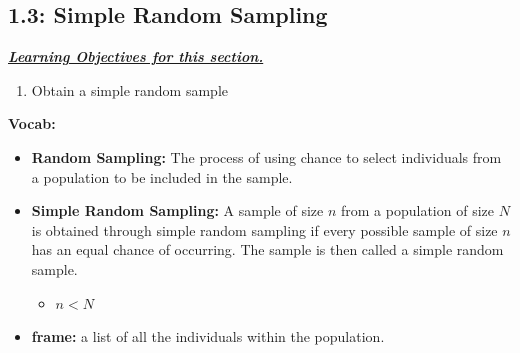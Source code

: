 \documentclass{report}
\begin{document}
        \pagebreak \bigbreak \noindent
        \subsection{1.3: Simple Random Sampling}
        \bigbreak \noindent 
        \textbf{\textit{\underline{Learning Objectives for this section.}}}
        \begin{enumerate}
            \item Obtain a simple random sample
        \end{enumerate}
        \bigbreak \noindent 
        \textbf{Vocab:}
        \begin{itemize}
            \item \textbf{Random Sampling:} The process of using chance to select individuals from a population to be included in the sample.
            \item \textbf{Simple Random Sampling:} A sample of size $n$  from a population of size $N $  is obtained through simple random sampling if every possible sample of size $n$  has an equal chance of occurring. The sample is then called a simple random sample.
                \begin{itemize}
                    \item $n < N $
                \end{itemize}
            \item \textbf{frame:} a list of all the individuals within the population.
        \end{itemize}

        \bigbreak \noindent 
\end{document}
